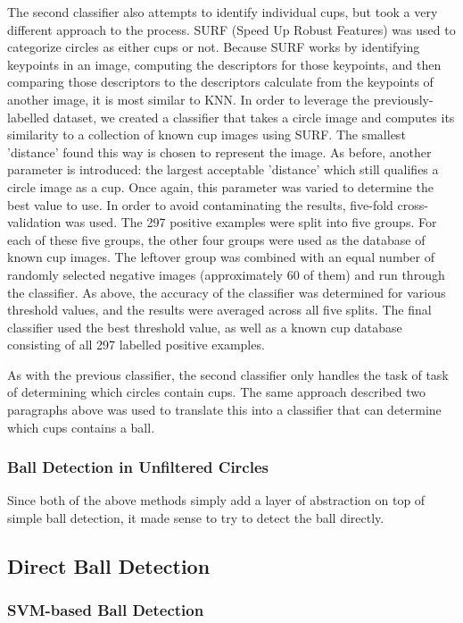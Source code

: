 \documentclass[letterpaper, 10 pt, conference]{ieeeconf}  %
\begin{document}
The second classifier also attempts to identify individual cups, but took a very different approach to the process.  SURF (Speed Up Robust Features) was used to categorize circles as either cups or not.  Because SURF works by identifying keypoints in an image, computing the descriptors for those keypoints, and then comparing those descriptors to the descriptors calculate from the keypoints of another image, it is most similar to KNN.  In order to leverage the previously-labelled dataset, we created a classifier that takes a circle image and computes its similarity to a collection of known cup images using SURF.  The smallest 'distance' found this way is chosen to represent the image.  As before, another parameter is introduced: the largest acceptable 'distance' which still qualifies a circle image as a cup.  Once again, this parameter was varied to determine the best value to use.  In order to avoid contaminating the results, five-fold cross-validation was used.  The 297 positive examples were split into five groups.  For each of these five groups, the other four groups were used as the database of known cup images.  The leftover group was combined with an equal number of randomly selected negative images (approximately 60 of them) and run through the classifier.  As above, the accuracy of the classifier was determined for various threshold values, and the results were averaged across all five splits.  The final classifier used the best threshold value, as well as a known cup database consisting of all 297 labelled positive examples.

As with the previous classifier, the second classifier only handles the task of task of determining which circles contain cups.  The same approach described two paragraphs above was used to translate this into a classifier that can determine which cups contains a ball.

\subsubsection{Ball Detection in Unfiltered Circles}

Since both of the above methods simply add a layer of abstraction on top of simple ball detection, it made sense to try to detect the ball directly.  

\subsection{Direct Ball Detection}

\subsubsection{SVM-based Ball Detection}
\end{document}
